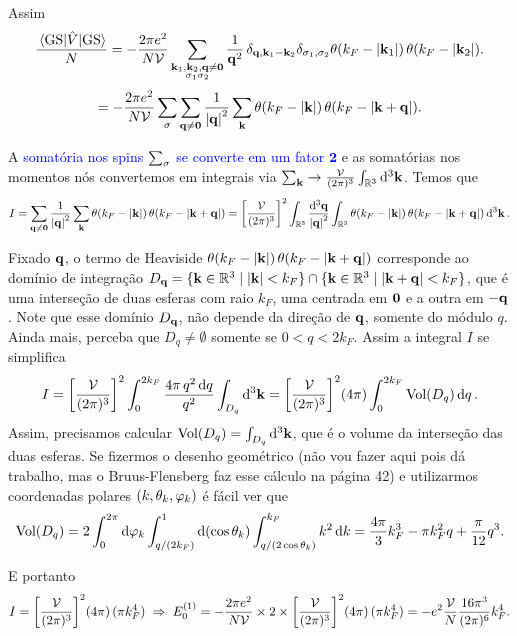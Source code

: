 \documentclass[a4paper,10pt]{article}
\begin{document}
Assim
$$
\frac{\ev{\hat{V}}{\text{GS}}}{N} =
- \frac{2 \pi e^2}{N \mathcal{V}} \sum_{\substack{\k_1, \k_2, \q \neq \0 \\ \s_1 \s_2}}
\frac{1}{\q^2} \,
\delta_{\q, \k_1 - \k_2} \delta_{\s_1, \s_2} \theta(k_F - \abs{\k_1}) \, \theta(k_F - \abs{\k_2}).
$$
$$
= - \frac{2 \pi e^2}{N \mathcal{V}} \sum_{\sigma} \sum_{\vb{q} \neq \vb{0}} \frac{1}{\abs{\vb{q}}^2} \sum_{\vb{k}}
\theta(k_F - \abs{\vb{k}}) \, \theta(k_F - \abs{\vb{k} + \vb{q}}).
$$

A \textcolor{blue}{somatória nos spins $\sum_{\sigma}$ se converte em um fator $\bm{2}$} e as somatórias nos momentos nós convertemos em integrais via $\sum_{\vb{k}} \to \frac{\mathcal{V}}{(2\pi)^3} \int_{\mathbb{R}^3} \dd[3]{\vb{k}}$. Temos que
$$
I = \sum_{\vb{q} \neq \vb{0}} \frac{1}{\abs{\vb{q}}^2} \sum_{\vb{k}}
\theta(k_F - \abs{\vb{k}}) \, \theta(k_F - \abs{\vb{k} + \vb{q}}) =
\qty[ \frac{\mathcal{V}}{(2\pi)^3} ]^2 \int_{\mathbb{R}^3} \frac{\dd[3]{\vb{q}}}{\abs{\vb{q}}^2} \int_{\mathbb{R}^3}
\theta(k_F - \abs{\vb{k}}) \, \theta(k_F - \abs{\vb{k} + \vb{q}}) \dd[3]{\vb{k}}.
$$

Fixado $\vb{q}$, o termo de Heaviside $\theta(k_F - \abs{\vb{k}}) \, \theta(k_F - \abs{\vb{k} + \vb{q}})$ corresponde ao domínio de integração $D_{\vb{q}} = \{\vb{k} \in \mathbb{R}^3 \mid \abs{\vb{k}} < k_F\} \cap \{\vb{k} \in \mathbb{R}^3 \mid \abs{\vb{k} + \vb{q}} < k_F\}$, que é uma interseção de duas esferas com raio $k_F$, uma centrada em $\vb{0}$ e a outra em $-\vb{q}$. Note que esse domínio $D_{\vb{q}}$, não depende da direção de $\vb{q}$, somente do módulo $q$. Ainda mais, perceba que $D_q \neq \emptyset$ somente se $0 < q < 2 k_F$. Assim a integral $I$ se simplifica
$$
I = \qty[\frac{\mathcal{V}}{(2\pi)^3}]^2 \int_0^{2k_F} \frac{4\pi \, q^2 \dd{q}}{q^2} \int_{D_q} \dd[3]{\vb{k}} =
\qty[\frac{\mathcal{V}}{(2\pi)^3}]^2 (4\pi) \int_0^{2k_F} \text{Vol}(D_q) \dd{q}.
$$
Assim, precisamos calcular $\text{Vol}(D_q) = \int_{D_q} \dd[3]{\vb{k}}$, que é o volume da interseção das duas esferas. Se fizermos o desenho geométrico (não vou fazer aqui pois dá trabalho, mas o Bruus-Flensberg faz esse cálculo na página 42) e utilizarmos coordenadas polares $(k, \theta_k, \varphi_k)$ é fácil ver que
$$
\text{Vol}(D_q) = 2 \int_0^{2\pi} \dd{\varphi_k} \int_{q / (2 k_F)}^{1} \dd(\cos\theta_k) \int_{q / (2 \cos\theta_k)}^{k_F} k^2 \dd{k} = \frac{4\pi}{3} k_F^3 - \pi k_F^2 q + \frac{\pi}{12} q^3.
$$

E portanto
$$
I = \qty[\frac{\mathcal{V}}{(2\pi)^3}]^2 (4\pi) \, (\pi k_F^4) \; \Rightarrow \;
E_0^{(1)} = - \frac{2 \pi e^2}{N \mathcal{V}} \times 2 \times
\qty[\frac{\mathcal{V}}{(2\pi)^3}]^2 (4\pi) \, (\pi k_F^4)
= - e^2 \frac{\mathcal{V}}{N}
\frac{16 \pi^3 }{(2\pi)^6} k_F^4 .
$$
\end{document}
